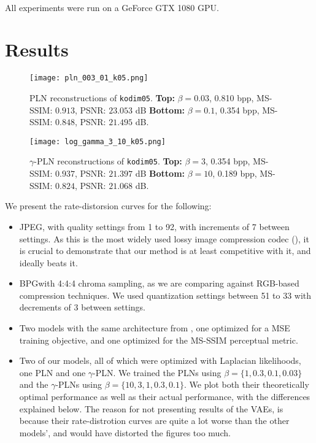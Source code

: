 \paragraph{}
All experiments were run on a GeForce GTX 1080 GPU.

\section{Results}
\begin{figure}
  \centering
  \texttt{[image: pln\_003\_01\_k05.png]}
  \caption[PLN reconstructions of \texttt{kodim05}.]
  {PLN reconstructions of \texttt{kodim05}. \textbf{Top:} $\beta =
    0.03$, 0.810 bpp, MS-SSIM: $0.913$, PSNR: $23.053$ dB \textbf{Bottom:}
    $\beta = 0.1$, 0.354 bpp, MS-SSIM: $0.848$, PSNR: $21.495$ dB.}
  \label{fig:pln_reconstruction}
\end{figure}
\begin{figure}
  \centering
  \texttt{[image: log\_gamma\_3\_10\_k05.png]}
  \caption[$\gamma$-PLN reconstructions of \texttt{kodim05}.]
  {$\gamma$-PLN reconstructions of \texttt{kodim05}. \textbf{Top:}
    $\beta = 3$, 0.354 bpp, MS-SSIM: $0.937$, PSNR: $21.397$ dB \textbf{Bottom:}
    $\beta = 10$, 0.189 bpp, MS-SSIM: $0.824$, PSNR: $21.068$ dB.}
  \label{fig:gamma_reconstruction}
\end{figure}
\par

We present the rate-distorsion curves for the following:
\begin{itemize}
\item JPEG, with quality settings from 1 to 92, with increments of 7 between
  settings. As this is the most widely used lossy image compression codec
  (\cite{bull2014communicating}), it is
  crucial to demonstrate that our method is at least competitive with it, and
  ideally beats it.
\item BPG\footnotemark with 4:4:4 chroma sampling, as we are comparing against
  RGB-based compression techniques. We used quantization settings between 51 to
  33 with decrements of 3 between settings.
\item Two models with the same architecture from \cite{balle2018variational},
  one optimized for a MSE training objective, and one optimized for the
  MS-SSIM perceptual metric.
\item Two of our models, all of which were optimized with Laplacian likelihoods,
  one PLN and one $\gamma$-PLN. We trained the PLNs using $\beta =
  \{1, 0.3, 0.1, 0.03\}$ and the $\gamma$-PLNs using $\beta =
  \{10, 3, 1, 0.3, 0.1\}$. We plot both their theoretically optimal
  performance as well as their actual performance, with the differences
  explained below. The reason for not presenting results of the VAEs, is because
  their rate-distrotion curves are quite a lot worse than the other
  models', and would have distorted the figures too much.
\end{itemize}


